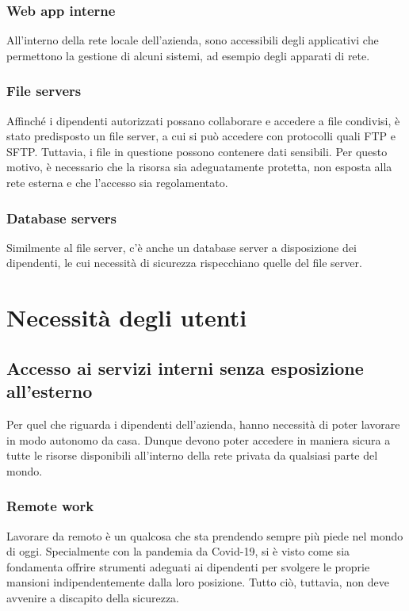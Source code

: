 \subsubsection{Web app interne}
All'interno della rete locale dell'azienda, sono accessibili degli applicativi che permettono la gestione di alcuni sistemi, ad esempio degli apparati di rete.
\subsubsection{File servers}
Affinché i dipendenti autorizzati possano collaborare e accedere a file condivisi, è stato predisposto un file server, a cui si può accedere con protocolli quali FTP \cite[RFC0791]{RFC0959} e SFTP. Tuttavia, i file in questione possono contenere dati sensibili. Per questo motivo, è necessario che la risorsa sia adeguatamente protetta, non esposta alla rete esterna e che l'accesso sia regolamentato.

\subsubsection{Database servers}
Similmente al file server, c'è anche un database server a disposizione dei dipendenti, le cui necessità di sicurezza rispecchiano quelle del file server.

\section{Necessità degli utenti}
\subsection{Accesso ai servizi interni senza esposizione all'esterno}
Per quel che riguarda i dipendenti dell'azienda, hanno necessità di poter lavorare in modo autonomo da casa. Dunque devono poter accedere in maniera sicura a tutte le risorse disponibili all'interno della rete privata da qualsiasi parte del mondo.
\subsubsection{Remote work}
Lavorare da remoto è un qualcosa che sta prendendo sempre più piede nel mondo di oggi. Specialmente con la pandemia da Covid-19, si è visto come sia fondamenta offrire strumenti adeguati ai dipendenti per svolgere le proprie mansioni indipendentemente dalla loro posizione.
Tutto ciò, tuttavia, non deve avvenire a discapito della sicurezza.

